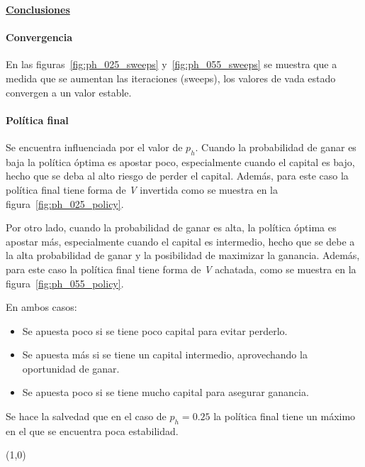 \indent\underline{\textbf{Conclusiones}}
\paragraph{Convergencia} En las figuras~\ref{fig:ph_025_sweeps} y~\ref{fig:ph_055_sweeps} se muestra que a medida que se aumentan las iteraciones (sweeps), los valores de vada estado convergen a un valor estable.

\paragraph{Política final} Se encuentra influenciada por el valor de $p_h$.
Cuando la probabilidad de ganar es baja la política óptima es apostar poco, especialmente cuando el capital es bajo, hecho que se deba al alto riesgo de perder el capital.
Además, para este caso la política final tiene forma de \textit{V} invertida como se muestra en la figura~\ref{fig:ph_025_policy}.

Por otro lado, cuando la probabilidad de ganar es alta, la política óptima es apostar más, especialmente cuando el capital es intermedio, hecho que se debe a la alta probabilidad de ganar y la posibilidad de maximizar la ganancia.
Además, para este caso la política final tiene forma de \textit{V} achatada, como se muestra en la figura~\ref{fig:ph_055_policy}.

En ambos casos:
\begin{itemize}
    \item Se apuesta poco si se tiene poco capital para evitar perderlo.
    \item Se apuesta más si se tiene un capital intermedio, aprovechando la oportunidad de ganar.
    \item Se apuesta poco si se tiene mucho capital para asegurar ganancia.
\end{itemize}

Se hace la salvedad que en el caso de $p_h = 0.25$ la política final tiene un máximo en el que se encuentra poca estabilidad.

\line(1,0){\textwidth}

